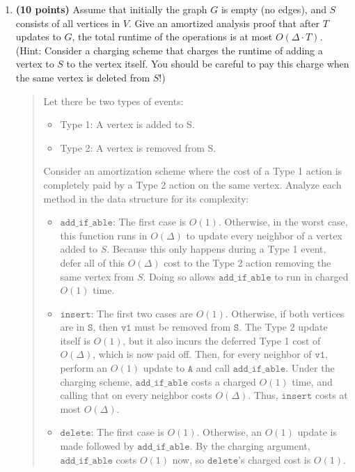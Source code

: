 \documentclass[11pt]{article}
\newcommand{\code}[1]{$\texttt{#1}$}
\begin{document}
\begin{enumerate}
\begin{enumerate}[resume]
\begin{quote}
    \end{quote}
    \item {\bf (10 points)} Assume that initially the graph $G$ is empty (no edges), and $S$ consists of all vertices in $V$. Give an amortized analysis proof that after $T$ updates to $G$, the total runtime of the operations is at most $O(\Delta\cdot T)$. (Hint: Consider a charging scheme that charges the runtime of adding a vertex to $S$ to the vertex itself. You should be careful to pay this charge when the same vertex is deleted from $S$!)
      \begin{quote}
        \color{purple}
        Let there be two types of events:
        \begin{itemize}
          \item Type 1: A vertex is added to S. 
          \item Type 2: A vertex is removed from S. 
        \end{itemize}
        Consider an amortization scheme where the cost of a Type 1 action is completely paid by a Type 2 action on the same vertex. Analyze each method in the data structure for its complexity:
        \begin{itemize}
          \item \code{add\_if\_able}: The first case is $O(1)$. Otherwise, in the worst case, this function runs in $O(\Delta)$ to update every neighbor of a vertex added to $S$. Because this only happens during a Type 1 event, defer all of this $O(\Delta)$ cost to the Type 2 action removing the same vertex from $S$. Doing so allows \code{add\_if\_able} to run in charged $O(1)$ time. 
          \item \code{insert}: The first two cases are $O(1)$. Otherwise, if both vertices are in \code{S}, then \code{v1} must be removed from \code{S}. The Type 2 update itself is $O(1)$, but it also incurs the deferred Type 1 cost of $O(\Delta)$, which is now paid off. Then, for every neighbor of \code{v1}, perform an $O(1)$ update to \code{A} and call \code{add\_if\_able}. Under the charging scheme, \code{add\_if\_able} costs a charged $O(1)$ time, and calling that on every neighbor costs $O(\Delta)$. Thus, \code{insert} costs at most $O(\Delta)$.
          \item \code{delete}: The first case is $O(1)$. Otherwise, an $O(1)$ update is made followed by \code{add\_if\_able}. By the charging argument, \code{add\_if\_able} costs $O(1)$ now, so \code{delete}'s charged cost is $O(1)$. 
        \end{itemize}


\end{quote}
\end{enumerate}
\end{enumerate}
\end{document}
